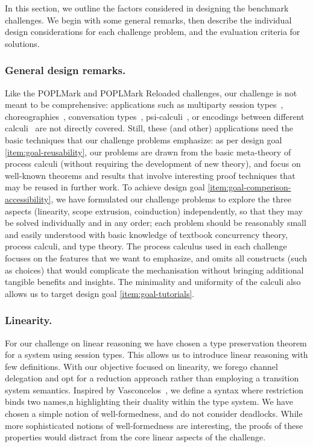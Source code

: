 \documentclass[runningheads]{llncs}
\begin{document}
In this section, we outline the factors considered in designing the benchmark challenges.
We begin with some general remarks, then describe the individual design considerations for each challenge problem, and the evaluation criteria for solutions.

\subsubsection{General design remarks.}
Like the POPLMark and POPLMark Reloaded challenges, our challenge is not meant to be comprehensive:
applications such as multiparty session types~\cite{10.1145/2827695,10.1145/3290343}, choreographies~\cite{DBLP:journals/jar/CruzFilipeMP23}, conversation types~\cite{DBLP:journals/tcs/CairesV10}, psi-calculi~\cite{lmcs:696}, or encodings between different calculi~\cite{DBLP:journals/iandc/Gorla10,DBLP:conf/forte/CairesP16,DBLP:journals/iandc/DardhaGS17,DBLP:conf/ecoop/ScalasDHY17,DBLP:journals/iandc/KouzapasPY19,10.1145/3479394.3479407} are not directly covered.
Still, these (and other) applications need the basic techniques that our challenge problems emphasize: as per design goal \ref{item:goal-reusability}, our problems are drawn from the basic meta-theory of process calculi (without requiring the development of new theory), and focus on well-known theorems and results that involve interesting proof techniques that may be reused in further work.
To achieve design goal \ref{item:goal-comperison-accessibility},
we have formulated our challenge problems to explore the three aspects (linearity, scope extrusion, coinduction) independently, so that they may be solved individually and in any order;
each problem should be reasonably small and easily understood with basic knowledge of textbook concurrency theory, process calculi, and type theory.  The process calculus used in each challenge
focuses on the features that we want to emphasize, and omits all constructs
(such as choices) that would complicate the mechanisation without bringing additional tangible
benefits and insights. 
The minimality and uniformity of the calculi also allows us to target design
goal \ref{item:goal-tutorials}.

\subsubsection{Linearity.}
For our challenge on linear reasoning we have chosen a type preservation theorem
for a system using session types.
This allows us to introduce linear reasoning with few definitions.
With our objective focused on linearity, we forego channel delegation
and opt for a reduction approach rather than employing a transition
system semantics.  Inspired by Vasconcelos~\cite{Vasconcelos2012}, we
define a syntax where restriction binds two names,n highlighting
their duality within the type system.  We have chosen a simple notion
of well-formedness, and do not  consider
deadlocks. While more sophisticated notions of well-formedness are
interesting, the proofs of these properties would distract from the
core linear aspects of the challenge.
\end{document}

